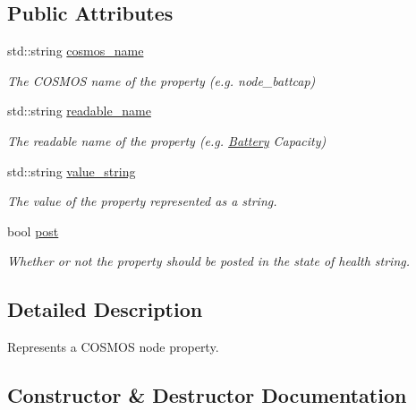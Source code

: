 \subsection*{Public Attributes}
\begin{DoxyCompactItemize}
\item 
std\+::string \hyperlink{structcubesat_1_1SimpleAgent_1_1NodeProperty_a6d3e8b9ad7ceba4dadbb90c036c3bd15}{cosmos\+\_\+name}
\begin{DoxyCompactList}\small\item\em The C\+O\+S\+M\+OS name of the property (e.\+g. node\+\_\+battcap) \end{DoxyCompactList}\item 
std\+::string \hyperlink{structcubesat_1_1SimpleAgent_1_1NodeProperty_a7251c568d143b84af02872dcc812b29c}{readable\+\_\+name}
\begin{DoxyCompactList}\small\item\em The readable name of the property (e.\+g. \hyperlink{classcubesat_1_1Battery}{Battery} Capacity) \end{DoxyCompactList}\item 
std\+::string \hyperlink{structcubesat_1_1SimpleAgent_1_1NodeProperty_aede92ae1ce895354a2cd9995cd7a8d6f}{value\+\_\+string}
\begin{DoxyCompactList}\small\item\em The value of the property represented as a string. \end{DoxyCompactList}\item 
bool \hyperlink{structcubesat_1_1SimpleAgent_1_1NodeProperty_a4e346ca338dcf56d731b5455895afa39}{post}
\begin{DoxyCompactList}\small\item\em Whether or not the property should be posted in the state of health string. \end{DoxyCompactList}\end{DoxyCompactItemize}


\subsection{Detailed Description}
Represents a C\+O\+S\+M\+OS node property. 

\subsection{Constructor \& Destructor Documentation}
\mbox{\label{structcubesat_1_1SimpleAgent_1_1NodeProperty_a381db507c0ff0f09dd6ad5f4b93743a8}} 
